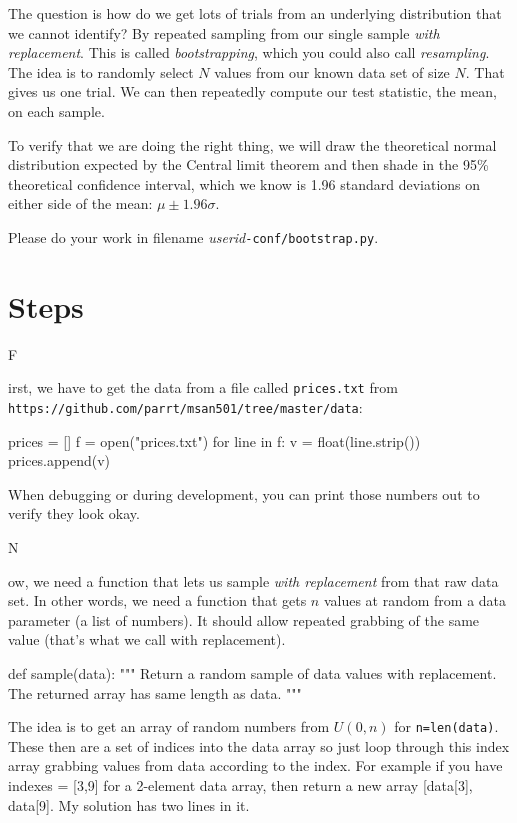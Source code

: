 \documentclass[titlepage]{tufte-book}
\newcounter{problem}
\newcommand{\step}[1]{{}
\vspace{4pt} \noindent {\bf \theproblem. }#1\addtocounter{problem}{1}}
\begin{document}
\begin{fullwidth}
The question is how do we get lots of trials from an underlying distribution that we cannot identify? By repeated sampling from our single sample {\em with replacement}. This is called {\em bootstrapping}, which you could also call {\em resampling}. The idea is to randomly select $N$ values from our known data set of size $N$. That gives us one trial. We can then repeatedly compute our test statistic, the mean, on each sample.

To verify that we are doing the right thing, we will draw the theoretical normal distribution expected by the Central limit theorem and then shade in the 95\% theoretical confidence interval, which we know is 1.96 standard deviations on either side of the mean: $\mu \pm 1.96\sigma$.

Please do your work in filename {\em userid}{\tt -conf/bootstrap.py}.

\section{Steps}

\step First, we have to get the data from a file called {\tt prices.txt} from \\
{\tt\small https://github.com/parrt/msan501/tree/master/data}:

\begin{pyverbatim}
prices = []
f = open("prices.txt")
for line in f:
	v = float(line.strip())
	prices.append(v)
\end{pyverbatim}

When debugging or during development, you can print those numbers out to verify they look okay.

\step Now, we need a function that lets us sample {\em with replacement} from that raw data set. In other words, we need a function that gets $n$ values at random from a data parameter (a list of numbers). It should allow repeated grabbing of the same value (that's what we call with replacement).

\begin{pyverbatim}
def sample(data):
	"""
	Return a random sample of data values with replacement.
	The returned array has same length as data.
	"""
\end{pyverbatim}

The idea is to get an array of random numbers from $U(0,n)$ for {\tt n=len(data)}. These then are a set of indices into the data array so just loop through this index array grabbing values from data according to the index. For example if you have indexes = [3,9] for a 2-element data array, then return a new array [data[3], data[9]. My solution has two lines in it.


\end{fullwidth}
\end{document}
